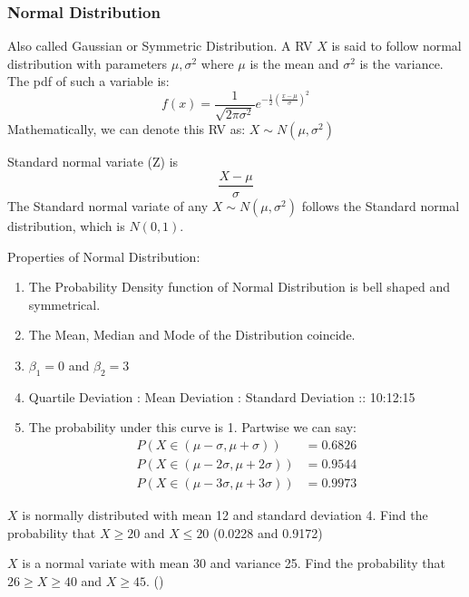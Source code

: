 \documentclass[11pt,letterpaper]{article}
\newenvironment{problem}[2][Problem]                                  
        {\begin{tcolorbox}[colback=white,colframe=gray!50,title=#1 #2]}
        {\end{tcolorbox}}
\begin{document}
\subsubsection{Normal Distribution}
Also called Gaussian or Symmetric Distribution.
A RV $X$ is said to follow normal distribution with parameters $\mu,\sigma^2$ where
$\mu$ is the mean and $\sigma^2$ is the variance.\\
The pdf of such a variable is: 
\[
  f(x) = \frac{1}{\sqrt{2\pi\sigma^2}} e^{-\frac{1}{2}\left( \frac{x-\mu}{\sigma}\right)^2}
\]
Mathematically, we can denote this RV as: $X\sim N(\mu,\sigma^2)$

\noindent
Standard normal variate (Z) is
\[
  \frac{X-\mu}{\sigma}
\]
The Standard normal variate of any $X\sim N(\mu,\sigma^2)$ follows the 
Standard normal distribution, which is $N(0,1)$.

\noindent
Properties of Normal Distribution: 
\begin{enumerate}
  \item The Probability Density function of Normal Distribution is bell shaped and 
    symmetrical. 
  \item The Mean, Median and Mode of the Distribution coincide. 
  \item $\beta_1 = 0$ and $\beta_2 = 3$    
  \item Quartile Deviation : Mean Deviation : Standard Deviation :: 10:12:15
  \item The probability under this curve is 1. Partwise we can say: \\
    \begin{align*}
      P(X \in (\mu-\sigma,\mu+\sigma)) &= 0.6826\\
      P(X \in (\mu-2\sigma,\mu+2\sigma)) &= 0.9544\\
      P(X \in (\mu-3\sigma,\mu+3\sigma)) &= 0.9973
    \end{align*}
\end{enumerate}

\begin{problem}{13}
  $X$ is normally distributed with mean 12 and standard deviation 4. Find the 
  probability that $X\geq20$ and $X\leq20$ \hfill (0.0228 and 0.9172) 
\end{problem}

\begin{problem}{14}
  $X$ is a normal variate with mean 30 and variance 25. Find the probability 
  that $26\geq X\geq 40$ and $X \geq 45$. \hfill ()
\end{problem}
\end{document}
